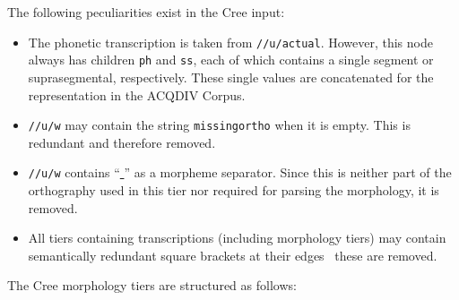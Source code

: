 \documentclass[a4paper, 11pt]{book}
\newcommand{\und}{\underline{{ }}\hspace{0.2mm}}	%
\begin{document}
\noindent The following peculiarities exist in the Cree input:

\begin{itemize}
	\item The phonetic transcription is taken from \texttt{//u/actual}. However, this node always has children \texttt{ph} and \texttt{ss}, 
		 each of which contains a single segment or suprasegmental, respectively. These single values are concatenated for the representation
		 in the ACQDIV Corpus. 
	\item \texttt{//u/w} may contain the string \texttt{missingortho} when it is empty. This is redundant and therefore removed. 
	\item \texttt{//u/w} contains “\und” as a morpheme separator. Since this is neither part of the orthography used in this tier  
		nor required for parsing the morphology, it is removed. 
	\item All tiers containing transcriptions (including morphology tiers) may contain semantically redundant square brackets at their edges \textendash\
		 these are removed.
\end{itemize}

\noindent The Cree morphology tiers are structured as follows: 
\end{document}
